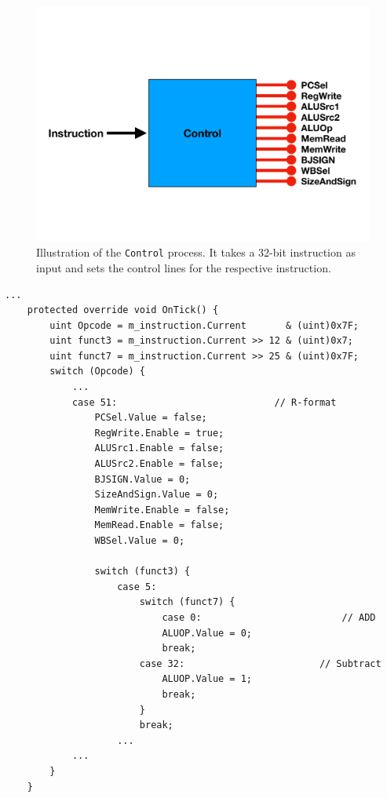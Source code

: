         
        \begin{figure}[h!]
            \centering
            \includegraphics[scale=0.35]{pictures/CONTROL.pdf}
            \caption{Illustration of the \texttt{Control} process. It takes a 32-bit instruction as input and sets the control lines for the respective instruction.}
            \label{fig:CONTROL}
        \end{figure}
    
        \begin{minipage}{\linewidth}
            \begin{lstlisting}[language={[Sharp]C}, caption={A slice of the \texttt{Control} process SME code. First 3 varibles are declared for the extracted \texttt{opcode}, \texttt{funct3} and \texttt{func7} fields. They are then used in the following \texttt{switch} statements to correctly identify the given instruction. Finally the control lines are set with the values for the respective instruction.},captionpos=b, label = CONTROL]
...
    protected override void OnTick() {
        uint Opcode = m_instruction.Current       & (uint)0x7F;  
        uint funct3 = m_instruction.Current >> 12 & (uint)0x7;  
        uint funct7 = m_instruction.Current >> 25 & (uint)0x7F;
        switch (Opcode) {
            ...
            case 51:                            // R-format
                PCSel.Value = false;
                RegWrite.Enable = true;
                ALUSrc1.Enable = false;
                ALUSrc2.Enable = false;
                BJSIGN.Value = 0;
                SizeAndSign.Value = 0;
                MemWrite.Enable = false;
                MemRead.Enable = false;
                WBSel.Value = 0;
                
                switch (funct3) {
                    case 5:
                        switch (funct7) {
                            case 0:                         // ADD
                            ALUOP.Value = 0;
                            break;
                        case 32:                        // Subtract
                            ALUOP.Value = 1;
                            break;
                        }
                        break;
                    ...
            ...
        }
    }
            \end{lstlisting}
        \end{minipage} 
\newpage
